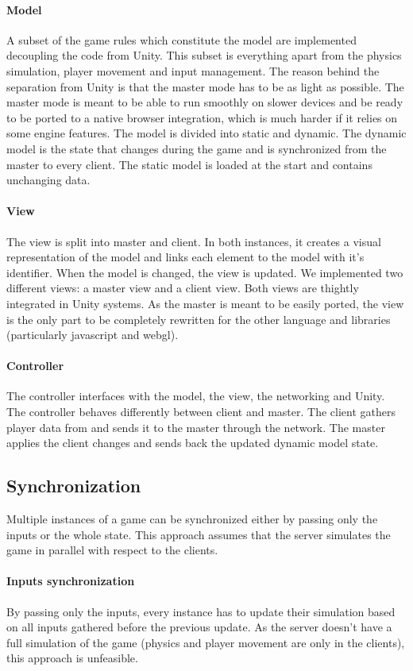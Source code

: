 \documentclass[12pt]{article}
\begin{document}
\paragraph{Model}
A subset of the game rules which constitute the model are implemented decoupling the code from Unity. This subset is everything apart from the physics simulation, player movement and input management. The reason behind the separation from Unity is that the master mode has to be as light as possible. The master mode is meant to be able to run smoothly on slower devices and be ready to be ported to a native browser integration, which is much harder if it relies on some engine features. The model is divided into static and dynamic. The dynamic model is the state that changes during the game and is synchronized from the master to every client. The static model is loaded at the start and contains unchanging data.
\paragraph{View}
The view is split into master and client. In both instances, it creates a visual representation of the model and links each element to the model with it's identifier. When the model is changed, the view is updated. We implemented two different views: a master view and a client view. Both views are thightly integrated in Unity systems. As the master is meant to be easily ported, the view is the only part to be completely rewritten for the other language and libraries (particularly javascript and webgl).
\paragraph{Controller}
The controller interfaces with the model, the view, the networking and Unity. The controller behaves differently between client and master. The client gathers player data from and sends it to the master through the network. The master applies the client changes and sends back the updated dynamic model state. 

\clearpage

\subsection{Synchronization}
Multiple instances of a game can be synchronized either by passing only the inputs or the whole state. This approach assumes that the server simulates the game in parallel with respect to the clients.

\paragraph{Inputs synchronization}
By passing only the inputs, every instance has to update their simulation based on all inputs gathered before the previous update. As the server doesn't have a full simulation of the game (physics and player movement are only in the clients), this approach is unfeasible.
\end{document}
